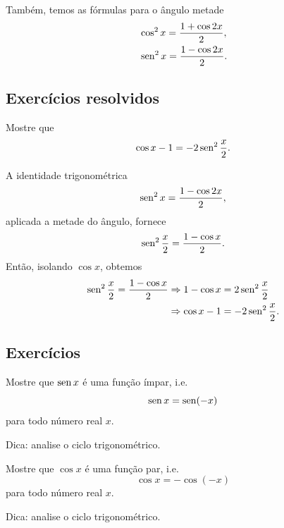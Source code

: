Também, temos as fórmulas para o ângulo metade
\begin{align}
  &\cos^2 x = \frac{1 + \cos 2x}{2},\\
  &\operatorname{sen}^2 x = \frac{1 - \cos 2x}{2}.\label{eq:id_trig_cos_x2}
\end{align}

\subsection*{Exercícios resolvidos}

\begin{exeresol}
  Mostre que
  \begin{equation}
    \cos x - 1 = -2\operatorname{sen}^2 \frac{x}{2}.
  \end{equation}
\end{exeresol}
\begin{resol}
  A identidade trigonométrica
  \begin{equation}
    \operatorname{sen}^2 x = \frac{1 - \cos 2x}{2},
  \end{equation}
  aplicada a metade do ângulo, fornece
  \begin{equation}
    \operatorname{sen}^2 \frac{x}{2} = \frac{1 - \cos x}{2}.
  \end{equation}
  Então, isolando $\cos x$, obtemos
  \begin{align}
    \operatorname{sen}^2 \frac{x}{2} = \frac{1 - \cos x}{2} &\Rightarrow 1 - \cos x = 2\operatorname{sen}^2 \frac{x}{2}\\
                                              &\Rightarrow \cos x - 1 = -2\operatorname{sen}^2 \frac{x}{2}.
  \end{align}
\end{resol}

\subsection*{Exercícios}

\begin{exer}
  Mostre que $\operatorname{sen} x$ é  uma função ímpar, i.e.
  \begin{equation}
    \operatorname{sen} x = \operatorname{sen}(-x)
  \end{equation}
  para todo número real $x$.
\end{exer}
\begin{resp}
  Dica: analise o ciclo trigonométrico.
\end{resp}

\begin{exer}
  Mostre que $\cos x$ é  uma função par, i.e.
  \begin{equation}
    \cos x = -\cos(-x)
  \end{equation}
  para todo número real $x$.
\end{exer}
\begin{resp}
  Dica: analise o ciclo trigonométrico.
\end{resp}

